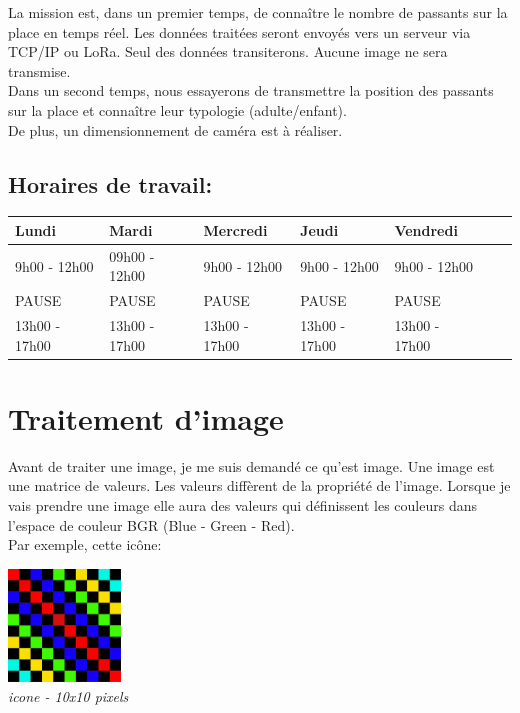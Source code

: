 \documentclass[12pt, french]{report}
\begin{document}
La mission est, dans un premier temps, de connaître le nombre de passants sur la place en temps réel. Les données traitées seront envoyés vers un serveur via TCP/IP ou LoRa. Seul des données transiterons. Aucune image ne sera transmise.\\ 

Dans un second temps, nous essayerons de transmettre la position des passants sur la place et connaître leur typologie (adulte/enfant).\\

De plus, un dimensionnement de caméra est à réaliser.


\subsection*{Horaires de travail:}

\begin{center}
        \begin{tabular}{|l|l|l|l|l|c|r|}
                \hline
                Lundi & Mardi & Mercredi & Jeudi & Vendredi \\
                \hline
                9h00 - 12h00 & 09h00 - 12h00 & 9h00 - 12h00 & 9h00 - 12h00 & 9h00 - 12h00 \\
                \hline
                PAUSE&PAUSE&PAUSE&PAUSE&PAUSE\\
                \hline
                13h00 - 17h00 & 13h00 - 17h00 & 13h00 - 17h00 & 13h00 - 17h00 & 13h00 - 17h00 \\ 
                \hline
        \end{tabular}
\end{center}
\newpage

\newpage
\strut									      %
\newpage							              %
\newpage

\section{Traitement d'image}
Avant de traiter une image, je me suis demandé ce qu'est image. Une image est une matrice de valeurs. Les valeurs diffèrent de la propriété de l'image. Lorsque je vais prendre une image elle aura des valeurs qui définissent les couleurs dans l'espace de couleur BGR (Blue - Green - Red).\\

Par exemple, cette icône:\\
\begin{center}
\includegraphics[width=3cm,heigth=3cm]{Images/iconeGrande.PNG}\\
\textit{icone - 10x10 pixels}
\end{center}
\end{document}
